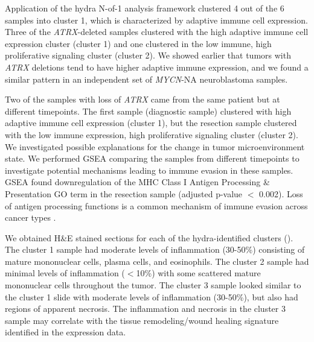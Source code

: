 \documentclass[10pt,letterpaper]{article}
\begin{document}
Application of the hydra N-of-1 analysis framework clustered 4 out of the 6 samples into cluster 1, which is characterized by adaptive immune cell expression. Three of the \textit{ATRX}-deleted samples clustered with the high adaptive immune cell expression cluster (cluster 1) and one clustered in the low immune, high proliferative signaling cluster (cluster 2). We showed earlier that tumors with \textit{ATRX} deletions tend to have higher adaptive immune expression, and we found a similar pattern in an independent set of \textit{MYCN}-NA neuroblastoma samples. 

Two of the samples with loss of \textit{ATRX} came from the same patient but at different timepoints. The first sample (diagnostic sample) clustered with high adaptive immune cell expression (cluster 1), but the resection sample clustered with the low immune expression, high proliferative signaling cluster (cluster 2). We investigated possible explanations for the change in tumor microenvironment state. We performed GSEA comparing the samples from different timepoints to investigate potential mechanisms leading to immune evasion in these samples. GSEA found downregulation of the MHC Class I Antigen Processing \& Presentation GO term in the resection sample (adjusted p-value $<$ 0.002). Loss of antigen processing functions is a common mechanism of immune evasion across cancer types \cite{reevesAntigenProcessingImmune2017}. 

We obtained H\&E stained sections for each of the hydra-identified clusters (). The cluster 1 sample had moderate levels of inflammation (30-50\%) consisting of mature mononuclear cells, plasma cells, and eosinophils. The cluster 2 sample had minimal levels of inflammation ($<$10\%) with some scattered mature mononuclear cells throughout the tumor. The cluster 3 sample looked similar to the cluster 1 slide with moderate levels of inflammation (30-50\%), but also had regions of apparent necrosis. The inflammation and necrosis in the cluster 3 sample may correlate with the tissue remodeling/wound healing signature identified in the expression data.
\end{document}
